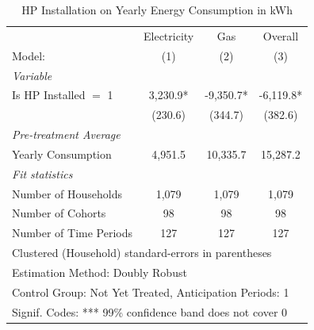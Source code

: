 \begin{table}[htbp]
   \caption{\label{tab:hp-did-cs-gas-only} HP Installation on Yearly Energy Consumption in kWh}
   \centering
   \begin{tabular}{lccc}
      \tabularnewline \midrule \midrule
                                     & Electricity     & Gas     & Overall \\   
      Model:                         & (1)              & (2)              & (3)\\  
      \midrule
      \emph{Variable}\\
      Is HP Installed $=$ 1          & 3,230.9* & -9,350.7* & -6,119.8*\\   
                                     & (230.6)         & (344.7)         & (382.6)\\   
      \midrule
      \emph{Pre-treatment Average}\\
      Yearly Consumption              & 4,951.5 & 10,335.7 & 15,287.2\\   
      \midrule
      \emph{Fit statistics}\\
      Number of Households                   & 1,079           & 1,079           & 1,079\\  
      Number of Cohorts              & 98              & 98              & 98\\  
      Number of Time Periods         & 127             & 127             & 127\\  
      \midrule \midrule
      \multicolumn{4}{l}{Clustered (Household) standard-errors in parentheses}\\
      \multicolumn{4}{l}{Estimation Method: Doubly Robust}\\
      \multicolumn{4}{l}{Control Group: Not Yet Treated, Anticipation Periods: 1}\\
      \multicolumn{4}{l}{Signif. Codes: *** 99\% confidence band does not cover 0}\\
   \end{tabular}
\end{table}


